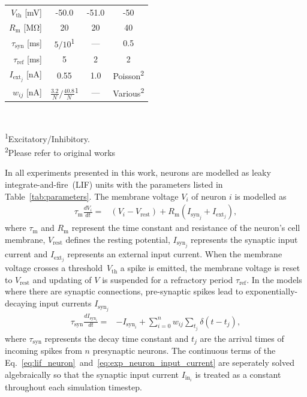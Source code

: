 \documentclass[9pt,twocolumn,twoside,lineno]{pnas-new}
\begin{document}
{\begin{table}
\begin{tabular}{r S S S}
        $V_{\text{th}}$ [\si{\milli\volt}]         & -50.0                     & -51.0             & -50 \\
        $R_{\text{m}}$ [\si{\mega\ohm}]                  & 20                        & 20                & 40 \\
        $\tau_{\text{syn}}$ [\si{\milli\second}]       & {$5/10$\textsuperscript{1}} & {---}             & 0.5\\
        $\tau_{\text{ref}}$ [\si{\milli\second}]       & 5                         & 2                 & 2 \\
        $I_{\text{ext}_j}$ [\si{\nano\ampere}]           & 0.55                      & 1.0    & {Poisson\textsuperscript{2}}\\
        $w_{ij}$ [\si{\nano\ampere}]            & {$\frac{3.2}{N}/\frac{40.8}{N}$\textsuperscript{1}}           & {---}            & {Various\textsuperscript{2}}\\
    \bottomrule
  \end{tabular}
  \mbox{ } \\[-0.2cm]
  \parbox{\columnwidth}{\small \textsuperscript{1}Excitatory/Inhibitory. \\
  \textsuperscript{2}Please refer to original works~\citep[Table 1,2]{Schmidt2018}}
\end{table}
In all experiments presented in this work, neurons are modelled as leaky integrate-and-fire~(LIF) units with the parameters listed in Table~\ref{tab:parameters}.
The membrane voltage $V_{i}$ of neuron $i$ is modelled as
%
\begin{align}
    \tau_{\text{m}} \frac{dV_{i}}{dt} = & (V_{i} - V_{\text{rest}}) + R_{\text{m}}(I_{\text{syn}_{j}} + I_{\text{ext}_{j}}), \label{eq:lif_neuron}
\end{align}
%
where $\tau_{\text{m}}$ and $R_{\text{m}}$ represent the time constant and resistance of the neuron's cell membrane, $V_{\text{rest}}$ defines the resting potential, $I_{\text{syn}_{j}}$ represents the synaptic input current and $I_{\text{ext}_j}$ represents an external input current.
When the membrane voltage crosses a threshold~$V_{\text{th}}$ a spike is emitted, the membrane voltage is reset to $V_{\text{rest}}$ and updating of $V$ is suspended for a refractory period $\tau_{\text{ref}}$.
In the models where there are synaptic connections, pre-synaptic spikes lead to exponentially-decaying input currents $I_{\text{syn}_{j}}$
%
\begin{align}
    \tau_{\text{syn}} \frac{dI_{\text{syn}_{i}}}{dt} = & -I_{\text{syn}_{i}} + \sum_{i=0}^{n} w_{ij} \sum_{t_{j}}  \delta(t - t_{j}),\label{eq:exp_neuron_input_current}
\end{align}
%
where $\tau_{\text{syn}}$ represents the decay time constant and $t_{j}$ are the arrival times of incoming spikes from $n$ presynaptic neurons.
The continuous terms of the Eq.~\ref{eq:lif_neuron}~and~\ref{eq:exp_neuron_input_current} are seperately solved algebraically so that the synaptic input current $I_{\text{in}_{i}}$ is treated as a constant throughout each simulation timestep.}
\showmatmethods{} %
\end{document}

